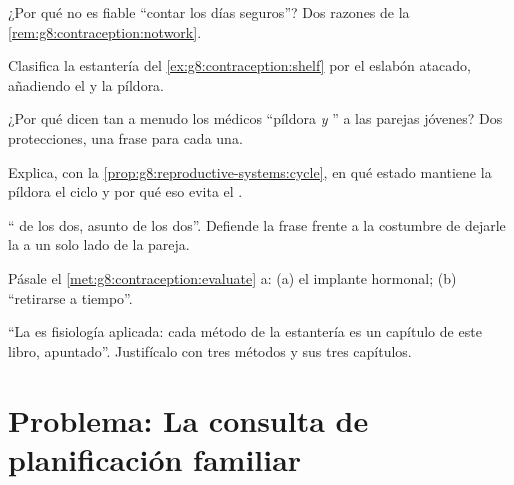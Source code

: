 \begin{exercise}[$\star$]\label{exo:g8:contraception:6}
¿Por qué no es fiable ``contar los días seguros''? Dos razones de la
\cref{rem:g8:contraception:notwork}.
\end{exercise}

\begin{exercise}[$\star\star$]\label{exo:g8:contraception:7}
Clasifica la estantería del \cref{ex:g8:contraception:shelf} por el
eslabón atacado, añadiendo el  y la píldora.
\end{exercise}

\begin{exercise}[$\star\star$]\label{exo:g8:contraception:8}
¿Por qué dicen tan a menudo los médicos ``píldora \emph{y}
'' a las parejas jóvenes? Dos protecciones, una frase para
cada una.
\end{exercise}

\begin{exercise}[$\star\star$]\label{exo:g8:contraception:9}
Explica, con la \cref{prop:g8:reproductive-systems:cycle}, en qué
estado mantiene la píldora el ciclo y por qué eso evita el .
\end{exercise}

\begin{exercise}[$\star\star$]\label{exo:g8:contraception:10}
`` de los dos, asunto de los dos''. Defiende la frase frente a
la costumbre de dejarle la  a un solo lado de la pareja.
\end{exercise}

\begin{exercise}[$\star\star$]\label{exo:g8:contraception:11}
Pásale el \cref{met:g8:contraception:evaluate} a: (a) el implante
hormonal; (b) ``retirarse a tiempo''.
\end{exercise}

\begin{exercise}[$\star\star\star$]\label{exo:g8:contraception:12}
``La  es fisiología aplicada: cada método de la
estantería es un capítulo de este libro, apuntado''. Justifícalo con
tres métodos y sus tres capítulos.
\end{exercise}

\section{Problema: La consulta de planificación familiar}

